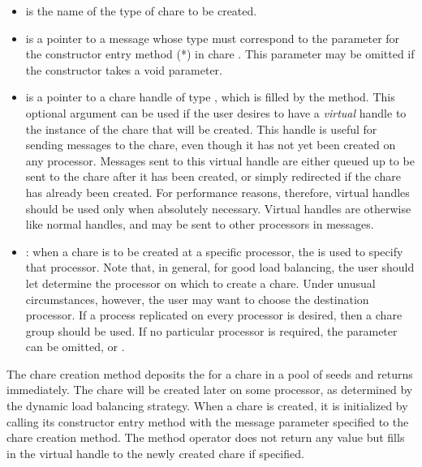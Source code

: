 \begin{itemize}

\item {} is the name of the type of chare to be
created.

\item {} is a pointer to a message whose type must
correspond to the parameter for the constructor entry method
(*) in chare .  This
parameter may be omitted if the constructor takes a void
parameter.

\item {} is a pointer to a chare handle of type
, which is filled by the  method. This optional
argument can be used if the user desires to have a {\em virtual} handle
 to the instance of the chare that will be
created. This handle is useful for sending messages to the
chare, even though it has not yet been created on any processor.
Messages sent to this virtual handle are either queued up to be sent to the
chare after it has been created, or simply redirected if the
chare has already been created. For performance reasons,
therefore, virtual handles should be used only when absolutely necessary.
Virtual handles are otherwise like normal handles, and may be
sent to other processors in messages.  

\item {}: when a chare is to be created at a specific
processor, the  is used to specify that processor.  Note that, in
general, for good load balancing, the user should let
\charmpp{} determine the processor on which to create a chare.
Under unusual circumstances, however, the user may want to choose the
destination processor.  If a process replicated on every processor is desired,
then a chare group should be used.  If no particular
processor is required, the parameter can be omitted, or .

\end{itemize}

The chare creation method deposits the  for
a chare in a pool of seeds and returns immediately. The chare will
be created later on some processor, as determined by the dynamic load balancing strategy. When a chare is created, it is
initialized by calling its   constructor entry method with the message parameter specified to the
chare creation method.  The method operator does not return any
value but fills in the virtual handle to the newly
created chare if specified.

